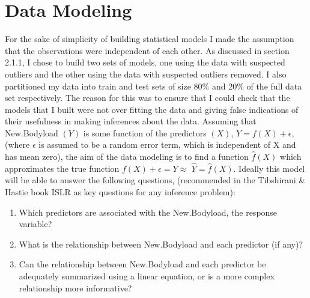 \section{Data Modeling}
For the sake of simplicity of building statistical models I made the assumption that the observations were independent of each other. As discussed in section 2.1.1, I chose to build two sets of models, one using the data with suspected outliers and the other using the data with suspected outliers removed. I also partitioned my data into train and test sets of size 80\% and 20\% of the full data set respectively. The reason for this was to ensure that I could check that the models that I built were not over fitting the data and giving false indications of their usefulness in making inferences about the data. Assuming that New.Bodyload $(Y)$ is some function of the predictors $(X)$, $Y=f(X)+\epsilon$, (where $\epsilon$ is assumed to be a random error term, which is independent of X and has mean zero), the aim of the data modeling is to find a function $\hat{f}(X)$ which approximates the true function    $f(X)+\epsilon=Y \approx $ $\hat{Y} = \hat{f}(X)$. Ideally this model will be able to answer the following questions, (recommended in the Tibshirani \& Hastie book ISLR as key questions for any inference problem)\cite{ISLR}: 
\begin{enumerate}
\item Which predictors are associated with the New.Bodyload, the response variable?
\item What is the relationship between New.Bodyload and each predictor (if any)?
\item Can the relationship between New.Bodyload and each predictor be adequately summarized
using a linear equation, or is a more complex relationship more informative?
\end{enumerate}
